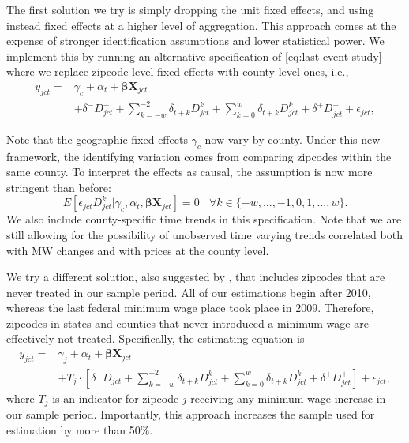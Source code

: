     The first solution we try is simply dropping the unit fixed effects, and using instead fixed effects at a higher level of aggregation. This approach comes at the expense of stronger identification assumptions and lower statistical power. We implement this by running an alternative specification of \eqref{eq:last-event-study} where we replace zipcode-level fixed effects with county-level ones, i.e.,
    \begin{equation*}\label{eq:last-event-study-countyFE}
        \begin{split}
            y_{jct} = & \gamma_{c} + \alpha_{t} + \boldsymbol{\beta} \boldsymbol{X}_{jct} \\
            & + \delta^{-} D_{jct}^{-} + \sum\limits_{k = -w}^{-2}\delta_{t + k}D_{jct}^k + \sum\limits_{k = 0}^{w}\delta_{t + k} D_{jct}^k + \delta^{+} D_{jct}^{+} + \epsilon_{jct} ,
        \end{split}   
    \end{equation*}
    
    Note that the geographic fixed effects $\gamma_{c}$ now vary by county. Under this new framework, the identifying variation comes from comparing zipcodes within the same county. To interpret the effects as causal, the assumption is now more stringent than before: $$E \left[ \epsilon_{jct} D_{jct}^k | \gamma_c, \alpha_{t}, \boldsymbol{\beta} \boldsymbol{X}_{jct}\right]  = 0 \  \ \ \ \forall k\in\{-w, ..., -1, 0, 1, ..., w\} .$$ We also include county-specific time trends in this specification. Note that we are still allowing for the possibility of unobserved time varying trends correlated both with MW changes and with prices at the county level.
    
    We try a different solution, also suggested by \textcite{BorusyakJaravel2017}, that includes zipcodes that are never treated in our sample period. All of our estimations begin after 2010, whereas the last federal minimum wage place took place in 2009. Therefore, zipcodes in states and counties that never introduced a minimum wage are effectively not treated. Specifically, the estimating equation is
    \begin{equation*}\label{eq:last-event-study-control}
        \begin{split}
            y_{jct} = & \gamma_{j} + \alpha_{t} + \boldsymbol{\beta} \boldsymbol{X}_{jct} \\
            & + T_j\cdot\left[\delta^{-} D_{jct}^{-} + \sum\limits_{k = -w}^{-2}\delta_{t + k}D_{jct}^k + \sum\limits_{k = 0}^{w}\delta_{t + k} D_{jct}^k + \delta^{+} D_{jct}^{+}\right] + \epsilon_{jct} , 
        \end{split}   
    \end{equation*}
    where $T_j$ is an indicator for zipcode $j$ receiving any minimum wage increase in our sample period. Importantly, this approach increases the sample used for estimation by more than 50\%.
    
